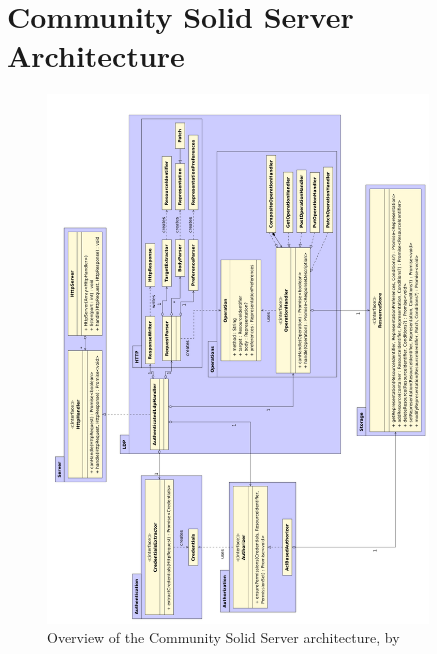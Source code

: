 \section{Community Solid Server Architecture}
\label{appendix:css-architecture}
\begin{figure}[h]
   \centering
   \includegraphics[width =0.9\textwidth]{appendices/solid-architecture/solid-architecture-v1-3-0-overview.pdf}
 \caption{Overview of the Community Solid Server architecture, by \citet{solid-diagram}}
 \label{fig:solid-arch}
\end{figure}